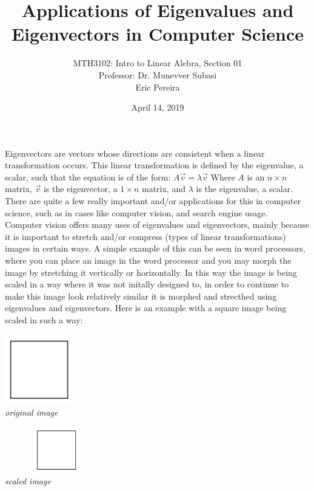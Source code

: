 \documentclass{article}
\title{Applications of Eigenvalues and Eigenvectors in Computer Science}
\author{MTH3102: Intro to Linear Alebra, Section 01\\
	Professor: Dr. Munevver Subasi \\
	Eric Pereira}
\date{April 14, 2019}
\newcommand\tab[1][1cm]{\hspace*{#1}}
\begin{document}
	
	\maketitle
	
	\tab Eigenvectors are vectors whose directions are consistent when a linear transformation
	occurs. This linear transformation is defined by the eigenvalue, a scalar, such that the
	equation is of the form: $A\vec{v} = \lambda \vec{v}$ Where $A$ is an $n\times n$ matrix, 
	$\vec{v}$ is the eigenvector, a $1\times n$ matrix, and $\lambda$ is the eigenvalue, a
	scalar. There are quite a few really important and/or applications for this in computer
	science, such as in cases like computer vision, and search engine usage. \\
	\tab Computer vision offers many uses of eigenvalues and eigenvectors, mainly because it is 
	important to stretch and/or compress (types of linear transformations) images in certain
	ways. A simple example of this can be seen in word processors, where you can place an image
	in the word processor and you may morph the image by stretching it vertically or
	horizontally. In this way the image is being scaled in a way where it was not initally
	designed to, in order to continue to make this image look relatively similar it is morphed
	and strecthed using eigenvalues and eigenvectors. Here is an example with a square image
	being scaled in such a way:
	
	\begin{multicols}{2}
		\begin{center}
			\includegraphics[height=3cm]{square.png} \\
			\textit{original image}
		\end{center}
		\columnbreak
		\begin{center}
			\includegraphics[width=4.5cm,height=2cm]{square.png} \\
			\textit{scaled image}
		\end{center}
	\end{multicols}
\end{document}
